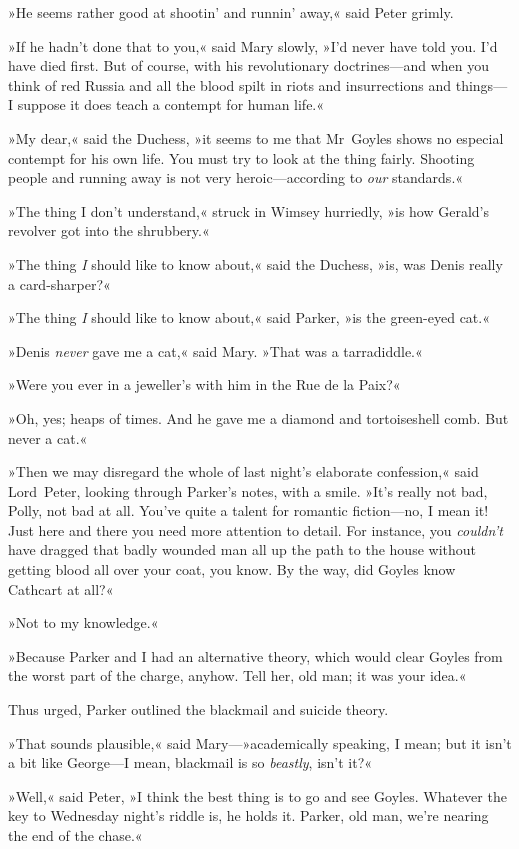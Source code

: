 »He seems rather good at shootin' and runnin' away,« said Peter grimly.

»If he hadn't done that to you,« said Mary slowly, »I'd never have told you. I'd have died first. But of course, with his revolutionary doctrines—and when you think of red Russia and all the blood spilt in riots and insurrections and things—I suppose it does teach a contempt for human life.«

»My dear,« said the Duchess, »it seems to me that Mr~Goyles shows no especial contempt for his own life. You must try to look at the thing fairly. Shooting people and running away is not very heroic—according to \textit{our} standards.«

»The thing I don't understand,« struck in Wimsey hurriedly, »is how Gerald's revolver got into the shrubbery.«

»The thing \textit{I} should like to know about,« said the Duchess, »is, was Denis really a card-sharper?«

»The thing \textit{I} should like to know about,« said Parker, »is the green-eyed cat.«

»Denis \textit{never} gave me a cat,« said Mary. »That was a tarradiddle.«

»Were you ever in a jeweller's with him in the Rue de la Paix?«

»Oh, yes; heaps of times. And he gave me a diamond and tortoiseshell comb. But never a cat.«

»Then we may disregard the whole of last night's elaborate confession,« said Lord~Peter, looking through Parker's notes, with a smile. »It's really not bad, Polly, not bad at all. You've quite a talent for romantic fiction—no, I mean it! Just here and there you need more attention to detail. For instance, you \textit{couldn't} have dragged that badly wounded man all up the path to the house without getting blood all over your coat, you know. By the way, did Goyles know Cathcart at all?«

»Not to my knowledge.«

»Because Parker and I had an alternative theory, which would clear Goyles from the worst part of the charge, anyhow. Tell her, old man; it was your idea.«

Thus urged, Parker outlined the blackmail and suicide theory.

»That sounds plausible,« said Mary—»academically speaking, I mean; but it isn't a bit like George—I mean, blackmail is so \textit{beastly}, isn't it?«

»Well,« said Peter, »I think the best thing is to go and see Goyles.  Whatever the key to Wednesday night's riddle is, he holds it. Parker, old man, we're nearing the end of the chase.«
